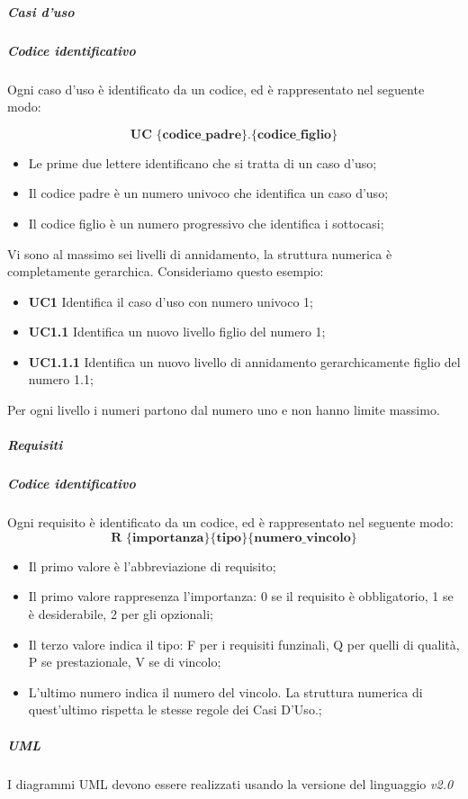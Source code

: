 				\subparagraph{Casi d'uso}
			\subparagraph{Codice identificativo} \Spazio
			Ogni caso d'uso è identificato da un codice, ed è rappresentato nel seguente modo:
			
		    $$ \textbf{UC \{codice\_padre\}.\{codice\_figlio\}  } $$
			
			\begin{itemize}
				\item Le prime due lettere identificano che si tratta di un caso d'uso;
				\item Il codice padre è un numero univoco che identifica un caso d'uso;
				\item Il codice figlio è un numero progressivo che identifica i sottocasi;
			\end{itemize}
		Vi sono al massimo sei livelli di annidamento, la struttura numerica è completamente gerarchica.
		Consideriamo questo esempio:
		\begin{itemize}
			\item \textbf{UC1} Identifica il caso d'uso con numero univoco 1;
			\item \textbf{UC1.1} Identifica un nuovo livello figlio del numero 1;
			\item \textbf{UC1.1.1} Identifica un nuovo livello di annidamento gerarchicamente figlio del numero 1.1;
		\end{itemize}
	    Per ogni livello i numeri partono dal numero uno e non hanno limite massimo. 
			\subparagraph{Requisiti}
			\subparagraph{Codice identificativo} \Spazio
			Ogni requisito è identificato da un codice, ed è rappresentato nel seguente modo:
			$$ \textbf{R \{importanza\}\{tipo\}\{numero\_vincolo\} } $$
			
			\begin{itemize}
				\item Il primo valore è l'abbreviazione di requisito;
				\item Il primo valore rappresenza l'importanza: 0 se il requisito è obbligatorio, 1 se è desiderabile, 2 per gli opzionali;
				\item Il terzo valore indica il tipo: F per i requisiti funzinali, Q per quelli di qualità, P se prestazionale, V se di vincolo;
				\item L'ultimo numero indica il numero del vincolo. La struttura numerica di quest'ultimo rispetta le stesse regole dei Casi D'Uso.;
			\end{itemize}
		
	        
		    
			\subparagraph{UML} \Spazio
			I diagrammi UML devono essere realizzati usando la versione del linguaggio \textit{v2.0}
			

